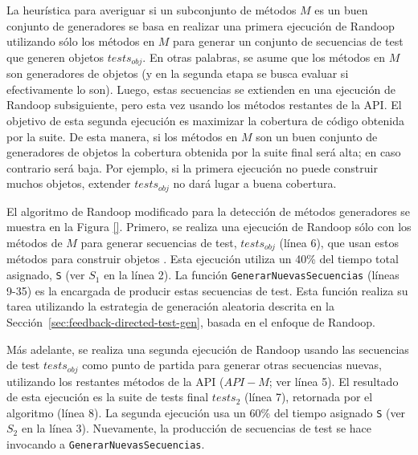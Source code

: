 La heurística para averiguar si un
subconjunto de métodos $M$ es un buen conjunto de generadores se basa en
realizar una primera ejecución de Randoop utilizando sólo los métodos en $M$ para
generar un conjunto de secuencias de test que generen objetos $tests_{obj}$. En
otras palabras, se asume que los métodos en $M$ son generadores de objetos (y
en la segunda etapa se busca evaluar si efectivamente lo son).
Luego, estas secuencias se extienden en una ejecución de Randoop subsiguiente,
pero esta vez usando los métodos restantes de la API. El objetivo de esta
segunda ejecución es maximizar la cobertura de código obtenida por la suite. 
De esta manera, si los métodos en $M$ son un buen conjunto de generadores de objetos
la cobertura obtenida por la suite final será alta; en caso contrario será baja. 
Por ejemplo, si la primera ejecución no puede construir muchos objetos, extender 
$tests_{obj}$ no dará lugar a buena cobertura.

El algoritmo de Randoop modificado para la detección de métodos generadores se muestra 
en la Figura \ref{}. 
Primero, se realiza una ejecución de Randoop sólo con los métodos de $M$ para
generar secuencias de test, $tests_{obj}$ (línea 6), que usan estos métodos para construir objetos . Esta ejecución utiliza un 40\% del tiempo total
asignado, \texttt{S} (ver $S_1$ en la línea 2). 
La función \texttt{GenerarNuevasSecuencias} (líneas 9-35) es la encargada de
producir estas secuencias de test. Esta función realiza su tarea utilizando 
la estrategia de generación aleatoria descrita en la Sección~\ref{sec:feedback-directed-test-gen}, basada en el enfoque de Randoop. 

Más adelante, se realiza una segunda ejecución
de Randoop usando las secuencias de test $tests_{obj}$ como punto de partida para
generar otras secuencias nuevas, utilizando los restantes métodos de la API
($API - M$; ver línea 5). El resultado de esta ejecución es la suite de tests final
$tests_2$ (línea 7), retornada por el algoritmo (línea 8).
La segunda ejecución usa un 60\% del tiempo
asignado \texttt{S} (ver $S_2$ en la línea 3). 
Nuevamente, la producción de secuencias de test se hace invocando a
\texttt{GenerarNuevasSecuencias}.


